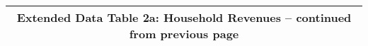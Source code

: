 \begin{longtable}{llcccccccccc}
\multicolumn{12}{c}{{\bfseries Extended Data Table 2a: Household Revenues -- continued from previous page}} \\ \hline                                                                                                                                                                                                                                                                                                                                                                                                                                                                                                                                                                                                                                                                                                                                                                                             

\end{longtable}
